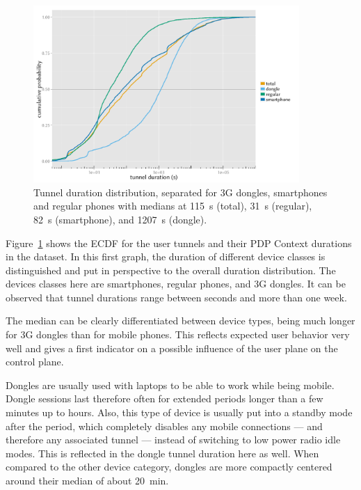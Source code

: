 \begin{figure}[htb]
	\centering
	\includegraphics[width=0.9\textwidth]{images/R-tunnel-duration-device-type.pdf}
	\caption{Tunnel duration distribution, separated for \acrshort{3G} dongles, smartphones and regular phones with medians at \SI{115}{\second} (total), \SI{31}{\second} (regular), \SI{82}{\second} (smartphone), and \SI{1207}{\second} (dongle).}
\label{c4:fig:cdf-duration-device-class}
\end{figure}

Figure~\ref{c4:fig:cdf-duration-device-class} shows the \gls{ECDF} for the user tunnels and their \gls{PDP} Context durations in the dataset. In this first graph, the duration of different device classes is distinguished and put in perspective to the overall duration distribution. The devices classes here are smartphones, regular phones, and \gls{3G} dongles. It can be observed that tunnel durations range between seconds and more than one week.

The median can be clearly differentiated between device types, being much longer for \gls{3G} dongles than for mobile phones. This reflects expected user behavior very well and gives a first indicator on a possible influence of the user plane on the control plane.

Dongles are usually used with laptops to be able to work while being mobile. Dongle sessions last therefore often for extended periods longer than a few minutes up to hours. Also, this type of device is usually put into a standby mode after the period, which completely disables any mobile connections --- and therefore any associated tunnel --- instead of switching to low power radio idle modes. This is reflected in the dongle tunnel duration here as well. When compared to the other device category, dongles are more compactly centered around their median of about \SI{20}{\minute}.

